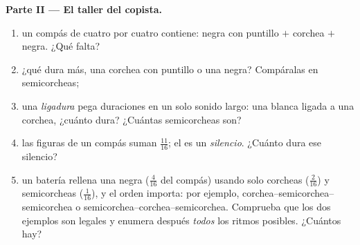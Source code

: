 \begin{problem}
\medskip
\noindent\textbf{Parte II --- El taller del copista.}
\begin{enumerate}[resume]
  \item un compás de cuatro por cuatro contiene: negra con puntillo $+$ corchea
        $+$ negra. ¿Qué falta?
  \item ¿qué dura más, una corchea con puntillo o una negra?
        Compáralas en semicorcheas;
  \item una \emph{ligadura} pega duraciones en un solo sonido
        largo: una blanca ligada a una corchea, ¿cuánto dura? ¿Cuántas
        semicorcheas son?
  \item las figuras de un compás suman $\frac{11}{16}$; el
         es un \emph{silencio}. ¿Cuánto dura ese
        silencio?
  \item un batería rellena una negra ($\frac{4}{16}$ del
        compás) usando solo corcheas ($\frac{2}{16}$) y
        semicorcheas ($\frac{1}{16}$), y el orden importa: por
        ejemplo, corchea--semicorchea--semicorchea o
        semicorchea--corchea--semicorchea. Comprueba que los dos ejemplos
        son legales y enumera después \emph{todos} los ritmos posibles.
        ¿Cuántos hay?
\end{enumerate}


\end{problem}
